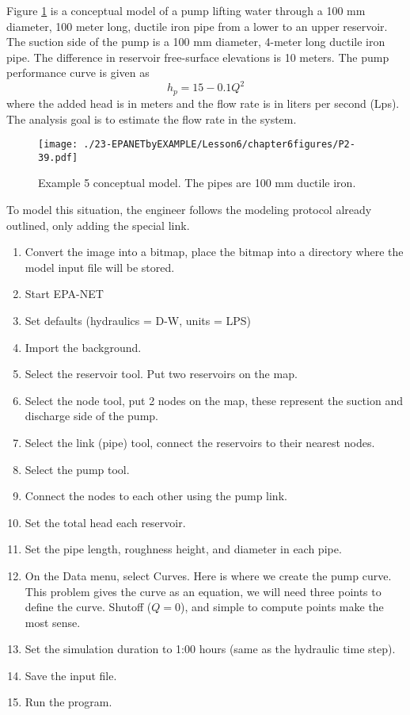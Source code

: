 Figure \ref{fig:P2-39.pdf} is a conceptual model of a pump lifting water through a 100 mm diameter, 100 meter long, ductile iron pipe from a lower to an upper reservoir.  The suction side of the pump is a 100 mm diameter, 4-meter long ductile iron pipe.  The difference in reservoir free-surface elevations is 10 meters.  The pump performance curve is given as
\begin{equation}
h_p = 15 - 0.1 Q^2
\end{equation}
where the added head is in meters and the flow rate is in liters per second (Lps).  The analysis goal is to estimate the flow rate in the system.
\begin{figure}[htbp] %
   \centering
   \texttt{[image: ./23-EPANETbyEXAMPLE/Lesson6/chapter6figures/P2-39.pdf]} 
   \caption{Example 5 conceptual model.  The pipes are 100 mm ductile iron.}
   \label{fig:P2-39.pdf}
\end{figure}
\newpage
To model this situation, the engineer follows the modeling protocol already outlined, only adding the special link.
\begin{enumerate}
\item Convert the image into a bitmap, place the bitmap into a directory where the model input file will be stored.
\item Start EPA-NET
\item Set defaults (hydraulics = D-W,  units = LPS)
\item Import the background.
\item Select the reservoir tool.  Put two reservoirs on the map.
\item Select the node tool, put 2 nodes on the map, these represent the suction and discharge side of the pump.
\item Select the link (pipe) tool, connect the reservoirs to their nearest nodes.  
\item Select the pump tool.
\item Connect the nodes to each other using the pump link.
\item Set the total head each reservoir.
\item Set the pipe length, roughness height, and diameter in each pipe.
\item On the Data menu, select Curves.  Here is where we create the pump curve.   This problem gives the curve as an equation, we will need three points to define the curve.   Shutoff ($Q=0$), and simple to compute points make the most sense.
\item Set the simulation duration to 1:00 hours (same as the hydraulic time step).
\item Save the input file.
\item Run the program.   
\end{enumerate}


